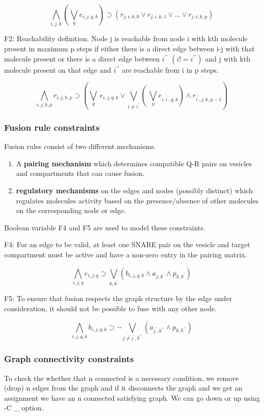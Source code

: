 \[ \bigwedge\limits_{i,j,k} (\bigvee_{q} e_{i,j,q,k}) \supset (r_{j,i,k,0}  \lor r_{j,i,k,1} \lor ... \lor r_{j,i,k,p}) \, \]

F2: Reachability definition. Node j is reachable from node i with kth molecule present in maximum p steps if either there is a direct edge between i-j with that molecule present or there is a direct edge between $i^{\prime \prime}$ $(i != i^{\prime \prime})$ and j with kth molecule present on that edge and $i^{\prime \prime}$ are reachable from i in p steps. 

\[ \bigwedge\limits_{i,j,k,p} r_{i,j,k,p} \supset (\bigvee_{q} \, e_{i,j,q,k} \lor \bigvee_{i\neq i^{\prime}} ( \, \bigvee_{q} e_{i,i^{\prime},q,k}) \land r_{i^{\prime},j,k,p-1} ) \, \]


\subsubsection{Fusion rule constraints}

Fusion rules consist of two different mechanisms.

\begin{enumerate}
\item  A \textbf{pairing mechanism} which determines compatible Q-R pairs on vesicles and compartments that can cause fusion.
\item \textbf{regulatory mechanisms} on the edges and nodes (possibly distinct) which regulates molecules activity based on the presence/absence of other molecules on the corresponding node or edge.
\end{enumerate}

Boolean variable F4 and F5 are used to model these constraints. 

F4: For an edge to be valid, at least one SNARE pair on the vesicle and target compartment must be active and have a non-zero entry in the pairing matrix.  

\[ \bigwedge\limits_{i,j,q} e_{i,j,q} \supset \bigvee_{k,k^{\prime}} (b_{i,j,q,k} \land a_{j,k^{\prime}} \land p_{k,k^{\prime}}) \, \]

F5: To ensure that fusion respects the graph structure by the edge under consideration, it should not be possible to fuse with any other node.

\[ \bigwedge\limits_{i,j,q,k} b_{i,j,q,k} \supset \neg \bigvee_{j \neq j^{\prime}, k^{\prime\prime}} ( a_{j^{\prime},k^{\prime\prime}} \land p_{k,k^{\prime\prime}}) \, \]


\subsubsection{Graph connectivity constraints}
To check the whether that n connected is a necessary condition, we remove (drop) n edges from the graph and if it disconnects the graph and we get an assignment we have an n connected satisfying graph. We can go down or up using -C \_ option.  \newline 

